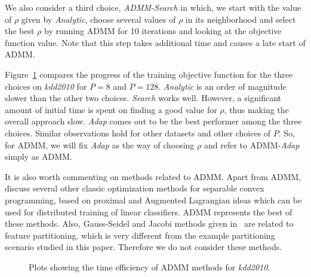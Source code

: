 \documentclass[twoside, 11pt]{article}
\begin{document}
We also consider a third choice, {\it{ADMM-Search}} in which, we start with the value of $\rho$ given by {\it Analytic}, choose several values of $\rho$ in its neighborhood and select the best $\rho$ by running ADMM for 10 iterations and looking at the objective function value.  Note that this step takes additional time and causes a late start of ADMM.

Figure~\ref{fig:admm} compares the progress of the training objective function for the three choices on {\it kdd2010} for $P=8$ and $P=128$.
{\it Analytic} is an order of magnitude slower than the other two choices. {\it Search} works well. However, a significant amount of initial time is spent on finding a good value for $\rho$, thus making the overall approach slow. {\it Adap} comes out to be the best performer among the three choices. Similar observations hold for other datasets and other choices of $P$. So, for ADMM, we will fix {\it Adap} as the way of choosing $\rho$ and refer to ADMM-{\it Adap} simply as ADMM.

It is also worth commenting on methods related to ADMM. Apart from ADMM,~\citet{bertsekas1997} discuss several other classic optimization methods for separable convex programming, based on proximal and Augmented Lagrangian ideas which can be used for distributed training of linear classifiers. ADMM represents the best of these methods. Also, Gauss-Seidel and Jacobi methods given in~\citet{bertsekas1997} are related to feature partitioning, which is very different from the example partitioning scenario studied in this paper. Therefore we do not consider these methods.

\begin{figure}[t]
\centering
{}
\caption{Plots showing the time efficiency of ADMM methods for {\it kdd2010}.}
\label{fig:admm}
\end{figure}
\end{document}
